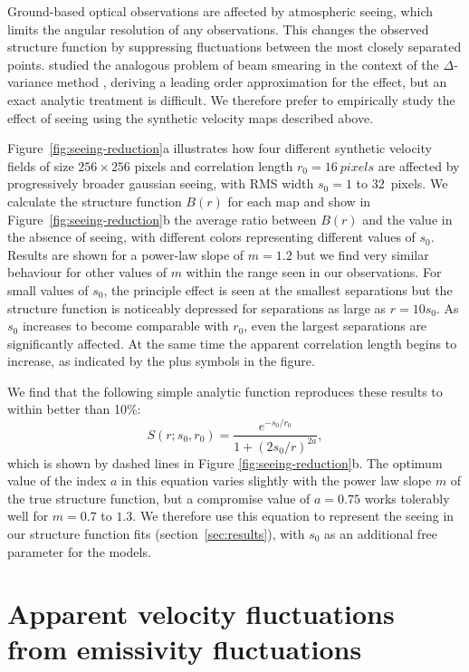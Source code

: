 \documentclass[fleqn,usenatbib, useAMS, a4paper]{mnras}
\begin{document}
Ground-based optical observations are affected by atmospheric seeing,
which limits the angular resolution of any observations.
This changes the observed structure function by suppressing fluctuations
between the most closely separated points.
\citet{Bensch:2001l} studied the  analogous problem
of beam smearing in the context of the \(\Delta\)-variance method \citep{Stutzki:1998a}, 
deriving a leading order approximation for the effect,
but an exact analytic treatment is difficult.
We therefore prefer to empirically study the effect of seeing using the
synthetic velocity maps described above.

Figure~\ref{fig:seeing-reduction}a illustrates how four different
synthetic velocity fields of size \(256\times256\) pixels
and correlation length \(r_0 = \SI{16}{pixels}\)
are affected by progressively broader gaussian seeing,
with RMS width \(s_0 = 1\) to \SI{32}{pixels}.
We calculate the structure function \(B(r)\) for each map and show
in Figure~\ref{fig:seeing-reduction}b the average ratio between
\(B(r)\) and the value in the absence of seeing,
with different colors representing different values of \(s_0\).
Results are shown for a power-law slope of \(m = 1.2\)
but we find very similar behaviour for other values of \(m\) within the range
seen in our observations.
For small values of \(s_0\), the principle effect is seen at
the smallest separations but the structure function is noticeably depressed
for separations as large as \(r = 10 s_0\).
As \(s_0\) increases to become comparable with \(r_0\),
even the largest separations are significantly affected.
At the same time the apparent correlation length begins to increase,
as indicated by the plus symbols in the figure.

We find that the following simple analytic function reproduces
these results to within better than 10\%:
\begin{equation}\label{eq:seeingemp2}
S(r; s_0, r_0) = \frac{e^{-s_0 / r_0}}{1+(2s_0 / r)^{2a}} ,
\end{equation}
which is shown by dashed lines in Figure \ref{fig:seeing-reduction}b.
The optimum value of the index \(a\) in this equation varies slightly
with the power law slope \(m\) of the true structure function,
but a compromise value of \(a = 0.75\) works tolerably well for \(m = 0.7\) to \(1.3\).
We therefore use this equation to represent the seeing
in our structure function fits (section~\ref{sec:results}),
with \(s_0\) as an additional free parameter for the models.

\section{Apparent velocity fluctuations from emissivity fluctuations}
\label{sec:appar-veloc-fluct}
\end{document}
